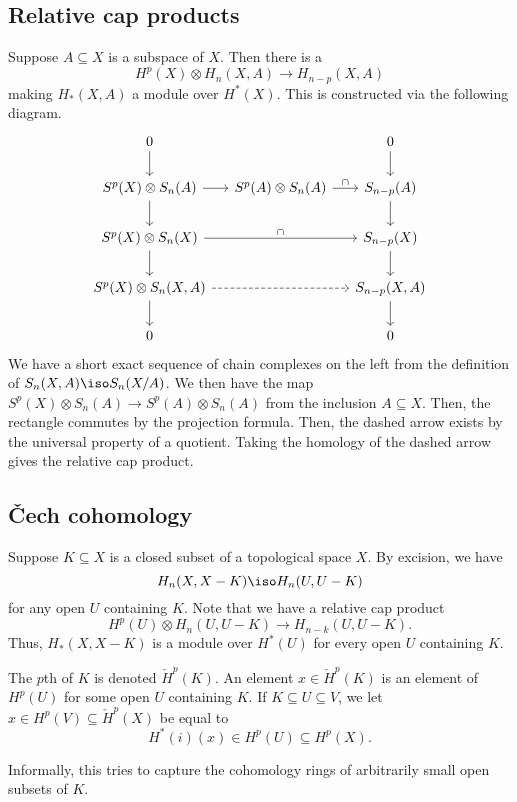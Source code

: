 \documentclass{standalone}
\begin{document}
\subsection{Relative cap products}
Suppose \(A \subseteq X\) is a subspace of \(X\).
Then there is a 
\[
  H^p(X) \otimes H_n(X, A) \to H_{n-p}(X, A)
\]
making \(H_*(X, A)\) a module over \(H^*(X)\).
This is constructed via the following diagram.
\[
  \begin{tikzcd}[column sep=small]
    0 \ar[d] && 0 \ar[d] \\
    S^p(X) \otimes S_n(A) \ar[r] \ar[d] &
      S^p(A) \otimes S_n(A) \ar[r, "\cap"] &
      S_{n-p}(A) \ar[d] \\
    S^p(X) \otimes S_n(X) \ar[rr, "\cap"] \ar[d] &&
      S_{n-p}(X) \ar[d] \\
    S^p(X) \otimes S_n(X, A) \ar[rr, dashed] \ar[d] &&
      S_{n-p}(X, A) \ar[d] \\
    0 && 0
  \end{tikzcd}
\]
We have a short exact sequence of chain complexes on the left
from the definition of \(S_n(X, A) \iso S_n(X / A)\).
We then have the map \(S^p(X) \otimes S_n(A) \to S^p(A) \otimes S_n(A)\)
from the inclusion \(A \subseteq X\).
Then, the rectangle commutes by the projection formula.
Then, the dashed arrow exists by the universal property of a quotient.
Taking the homology of the dashed arrow gives the relative cap product.

\subsection{\v{C}ech cohomology}
Suppose \(K \subseteq X\) is a closed subset of a topological space \(X\).
By excision, we have
\[
  H_n(X, X-K) \iso H_n(U, U-K)
\]
for any open \(U\) containing \(K\).
Note that we have a relative cap product
\[
  H^p(U) \otimes H_n(U, U-K) \to H_{n-k}(U, U-K).
\]
Thus, \(H_*(X, X-K)\) is a module over \(H^*(U)\)
for every open \(U\) containing \(K\).

\begin{definition}
  The \(p\)th  of \(K\)
  is denoted \(\check{H}^p(K)\).
  An element \(x \in \check{H}^p(K)\) is an element of \(H^p(U)\)
  for some open \(U\) containing \(K\).
  If \(K \subseteq U \overset{}\subseteq V\), we let
  \(x \in H^p(V) \subseteq \check{H}^p(X)\) be equal to
  \[
    H^*(i)(x) \in H^p(U) \subseteq H^p(X).
  \]
\end{definition}
Informally, this tries to capture the cohomology rings of
arbitrarily small open subsets of \(K\).
\end{document}
